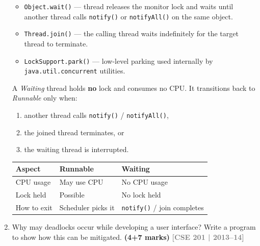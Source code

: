 \documentclass[12pt,a3paper]{article}
\newcommand{\yr}[1]{\hfill\textcolor{gray}{\small\textbf{[#1]}}}
\newcommand{\mk}[1]{\textcolor{orange!70!black}{\small\textbf{(#1 marks)}}}
\begin{document}
\begin{enumerate}
\begin{tcolorbox}[enhanced,breakable,ansbox,
  colback=cF!4,colframe=cF,boxrule=0.8pt,arc=5pt,
  title={\textbf{Answer — Runnable and Waiting States}},
  fonttitle=\bfseries\color{white},colbacktitle=cF]
\begin{itemize}[itemsep=2pt]
  \item \texttt{Object.wait()} --- thread releases the monitor lock
    and waits until another thread calls \texttt{notify()} or
    \texttt{notifyAll()} on the same object.
  \item \texttt{Thread.join()} --- the calling thread waits
    indefinitely for the target thread to terminate.
  \item \texttt{LockSupport.park()} --- low-level parking used
    internally by \texttt{java.util.concurrent} utilities.
\end{itemize}

A \emph{Waiting} thread holds \textbf{no} lock and consumes no CPU.
It transitions back to \emph{Runnable} only when:
\begin{enumerate}[label=(\roman*),itemsep=1pt]
  \item another thread calls \texttt{notify()} / \texttt{notifyAll()},
  \item the joined thread terminates, or
  \item the waiting thread is interrupted.
\end{enumerate}

\medskip
\begin{center}
\small
\begin{tabular}{@{}lll@{}}
\toprule
\textbf{Aspect} & \textbf{Runnable} & \textbf{Waiting} \\
\midrule
CPU usage     & May use CPU    & No CPU usage \\
Lock held     & Possible       & No lock held \\
How to exit   & Scheduler picks it & \texttt{notify()} / join completes \\
\bottomrule
\end{tabular}
\end{center}

\end{tcolorbox}

\item Why may deadlocks occur while developing a user interface? Write a program to show how this can be mitigated. \mk{4+7}
\yr{CSE 201 | 2013--14}

\begin{tcolorbox}[enhanced,breakable,ansbox,
  colback=cF!4,colframe=cF,boxrule=0.8pt,arc=5pt,
  title={\textbf{Answer --- Deadlocks in UI and How to Mitigate Them}},
  fonttitle=\bfseries\color{white},colbacktitle=cF]


\end{tcolorbox}
\end{enumerate}
\end{document}
